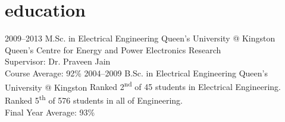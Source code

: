 
\section{education}

\begin{entrylist}
\entry
{2009--2013}
{M.Sc. {\normalfont in Electrical Engineering}}
{Queen's University @ Kingston}
{Queen’s Centre for Energy and Power Electronics Research\\
Supervisor: Dr. Praveen Jain\\
Course Average: 92\%}
{\vspace{-0.3cm}}
\entry
{2004--2009}
{B.Sc. {\normalfont in Electrical Engineering}}
{Queen's University @ Kingston}
{Ranked 2\textsuperscript{nd} of 45 students in Electrical Engineering.\\
Ranked 5\textsuperscript{th} of 576 students in all of Engineering.\\
Final Year Average: 93\%}
\end{entrylist}
